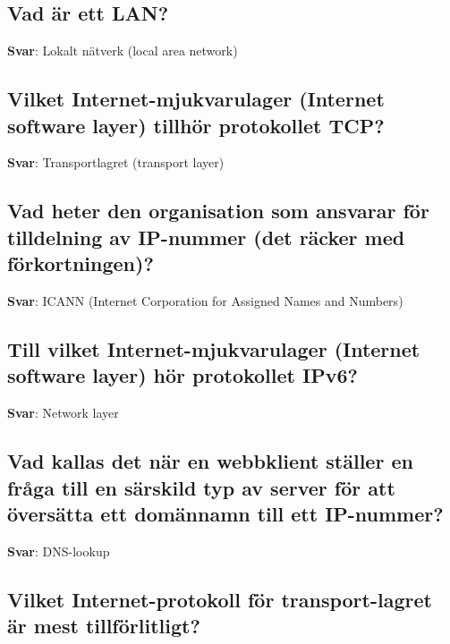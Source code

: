 \documentclass[a4paper,11pt,oneside]{article}
\begin{document}
\begin{sloppypar}
\subsection{Vad \"ar ett LAN?}

\label{q:21:sa:sv:True}

\textbf{Svar}: Lokalt n\"atverk (local area network)



\subsection{Vilket Internet-mjukvarulager (Internet software layer) tillh\"or protokollet TCP?}

\label{q:22:sa:sv:True}

\textbf{Svar}: Transportlagret (transport layer)



\subsection{Vad heter den organisation som ansvarar f\"or tilldelning av IP-nummer (det r\"acker med f\"orkortningen)?}

\label{q:23:sa:sv:True}

\textbf{Svar}: ICANN (Internet Corporation for Assigned Names and Numbers)



\subsection{Till vilket Internet-mjukvarulager (Internet software layer) h\"or protokollet IPv6?}

\label{q:24:sa:sv:True}

\textbf{Svar}: Network layer



\subsection{Vad kallas det n\"ar en webbklient st\"aller en fr\r{a}ga till en s\"arskild typ av server f\"or att \"overs\"atta ett dom\"annamn till ett IP-nummer?}

\label{q:25:sa:sv:True}

\textbf{Svar}: DNS-lookup



\subsection{Vilket Internet-protokoll f\"or transport-lagret \"ar mest tillf\"orlitligt?}


\end{sloppypar}
\end{document}
